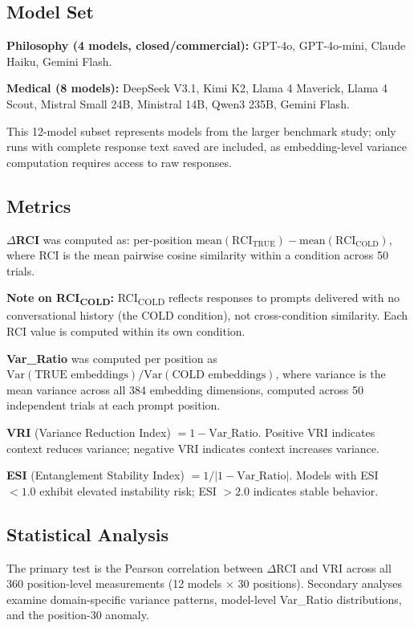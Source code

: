 \documentclass[11pt]{article}
\begin{document}
\subsection{Model Set}

\textbf{Philosophy (4 models, closed/commercial):}
GPT-4o, GPT-4o-mini, Claude Haiku, Gemini Flash.

\textbf{Medical (8 models):}
DeepSeek V3.1, Kimi K2, Llama 4 Maverick, Llama 4 Scout, Mistral Small 24B,
Ministral 14B, Qwen3 235B, Gemini Flash.

This 12-model subset represents models from the larger benchmark study; only runs with complete response text saved are included, as embedding-level variance computation requires access to raw responses.

\subsection{Metrics}

\textbf{$\Delta$RCI} was computed as: per-position $\text{mean}(\text{RCI}_{\text{TRUE}}) - \text{mean}(\text{RCI}_{\text{COLD}})$, where RCI is the mean pairwise cosine similarity within a condition across 50 trials.

\textbf{Note on RCI\textsubscript{COLD}:} RCI\textsubscript{COLD} reflects responses to prompts delivered with no conversational history (the COLD condition), not cross-condition similarity. Each RCI value is computed within its own condition.

\textbf{Var\_Ratio} was computed per position as $\text{Var}(\text{TRUE embeddings}) / \text{Var}(\text{COLD embeddings})$, where variance is the mean variance across all 384 embedding dimensions, computed across 50 independent trials at each prompt position.

\textbf{VRI} (Variance Reduction Index) $= 1 - \text{Var\_Ratio}$. Positive VRI indicates context reduces variance; negative VRI indicates context increases variance.

\textbf{ESI} (Entanglement Stability Index) $= 1 / |1 - \text{Var\_Ratio}|$. Models with ESI $< 1.0$ exhibit elevated instability risk; ESI $> 2.0$ indicates stable behavior.

\subsection{Statistical Analysis}

The primary test is the Pearson correlation between $\Delta$RCI and VRI across all 360 position-level measurements (12 models $\times$ 30 positions). Secondary analyses examine domain-specific variance patterns, model-level Var\_Ratio distributions, and the position-30 anomaly.
\end{document}
